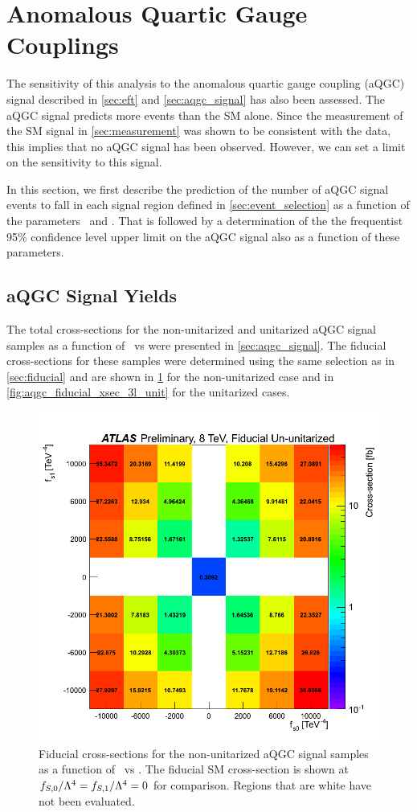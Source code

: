 \section{Anomalous Quartic Gauge Couplings}
\label{sec:aqgc_limit}

The sensitivity of this analysis to the anomalous quartic gauge coupling
(aQGC) signal described in \sec\ref{sec:eft} and 
\sec\ref{sec:aqgc_signal} has also been assessed.  The aQGC signal predicts
more events than the SM alone. Since the measurement of the SM signal in
\sec\ref{sec:measurement} was shown to be consistent with the data, this implies
that no aQGC signal has been observed. However, we can set a limit on the sensitivity 
to this signal.

In this section, we first describe the prediction of the number of aQGC signal events
to fall in each signal region defined in \sec\ref{sec:event_selection} as a function
of the parameters \fszero~and \fsone. That is followed by 
a determination of the the frequentist 95\% confidence level upper limit on the aQGC
signal also as a function of these parameters. 

\subsection{aQGC Signal Yields}
The total cross-sections for the non-unitarized and unitarized aQGC
signal samples as a function of \fszero~vs \fsone 
were presented in \sec\ref{sec:aqgc_signal}.
The fiducial cross-sections for these samples were determined using 
the same selection as in \sec\ref{sec:fiducial} and are shown in 
\fig\ref{fig:aqgc_fiducial_xsec_3l_ununit} for the non-unitarized case and 
in \fig\ref{fig:aqgc_fiducial_xsec_3l_unit} for the unitarized cases.

\begin{figure}[ht!]
\centering
\includegraphics[width=.8\textwidth]{figures/aQGC/fiducial_xsec/www_3l_aqgc_fiducial_ununitarized_noratio.png}
\caption{Fiducial cross-sections for the non-unitarized aQGC signal samples as a function of \fszero~vs \fsone.
The fiducial SM cross-section is shown at $f_{S,0}/\Lambda^4=f_{S,1}/\Lambda^4=0$ for comparison.
Regions that are white have not been evaluated.
}
\label{fig:aqgc_fiducial_xsec_3l_ununit}
\end{figure}

